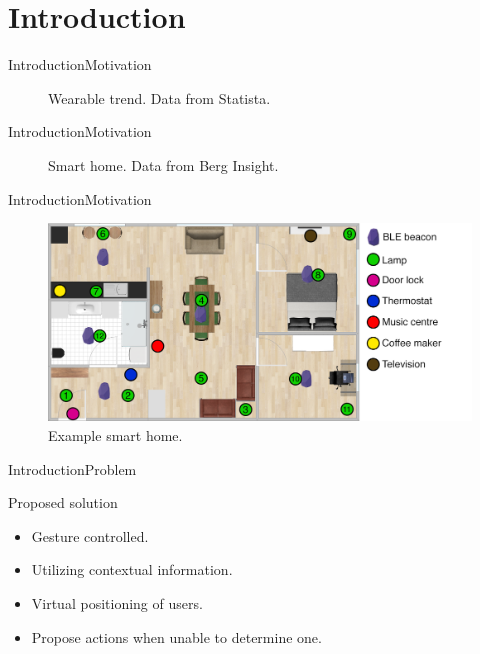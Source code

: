 \section{Introduction}
\begin{frame}{Introduction}{Motivation}
  \begin{figure}[!hbt]
    \centering
    \scalebox{.7}{}
    \caption{Wearable trend. Data from Statista.}
  \end{figure}
\end{frame}

\begin{frame}{Introduction}{Motivation}
  \begin{figure}[!hbt]
    \centering
    \scalebox{.7}{}
    \caption{Smart home. Data from Berg Insight.}
  \end{figure}
\end{frame}

\begin{frame}{Introduction}{Motivation}
\begin{figure}[h]
\centering
\includegraphics[width=\textwidth]{../images/room-with-beacons}
\caption{Example smart home.}
\end{figure}
\end{frame}

\begin{frame}{Introduction}{Problem}
\begin{block}{Proposed solution}
  \begin{itemize}
    \item Gesture controlled.
    \item Utilizing contextual information.
    \item Virtual positioning of users.
    \item Propose actions when unable to determine one.
  \end{itemize}
\end{block}
\end{frame}

